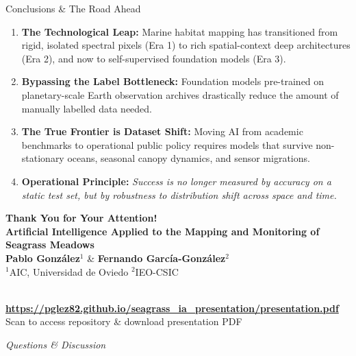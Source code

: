\documentclass[aspectratio=169,10pt]{beamer}
\begin{document}
\begin{frame}{Conclusions \& The Road Ahead}
  \begin{enumerate}
    \item \textbf{The Technological Leap:} Marine habitat mapping has transitioned from rigid, isolated spectral pixels (Era 1) to rich spatial-context deep architectures (Era 2), and now to self-supervised foundation models (Era 3).
    \vspace{0.15cm}
    \item \textbf{Bypassing the Label Bottleneck:} Foundation models pre-trained on planetary-scale Earth observation archives drastically reduce the amount of manually labelled data needed.
    \vspace{0.15cm}
    \item \textbf{The True Frontier is Dataset Shift:} Moving AI from academic benchmarks to operational public policy requires models that survive non-stationary oceans, seasonal canopy dynamics, and sensor migrations.
    \vspace{0.15cm}
    \item \textbf{Operational Principle:} \textit{Success is no longer measured by accuracy on a static test set, but by robustness to distribution shift across space and time.}
  \end{enumerate}
\end{frame}

\begin{frame}[standout]
  \vspace{-0.35cm}
  {\Large \textbf{Thank You for Your Attention!}}\\[6pt]
  \small \textbf{Artificial Intelligence Applied to the Mapping and Monitoring of Seagrass Meadows}\\[3pt]
  \footnotesize
  \textbf{Pablo González}$^{1}$ \quad \& \quad \textbf{Fernando García-González}$^{2}$\\[1pt]
  $^{1}$AIC, Universidad de Oviedo \quad $^{2}$IEO-CSIC\\[8pt]

  \begin{center}
    \setlength{\fboxsep}{4pt}%
    \\
    \vspace{0.2cm}
    \footnotesize \textbf{\url{https://pglez82.github.io/seagrass_ia_presentation/presentation.pdf}}\\[1pt]
    \scriptsize \textcolor{white!80}{Scan to access repository \& download presentation PDF}
  \end{center}
  \vspace{0.05cm}
  \textit{\small Questions \& Discussion}
\end{frame}
\end{document}

